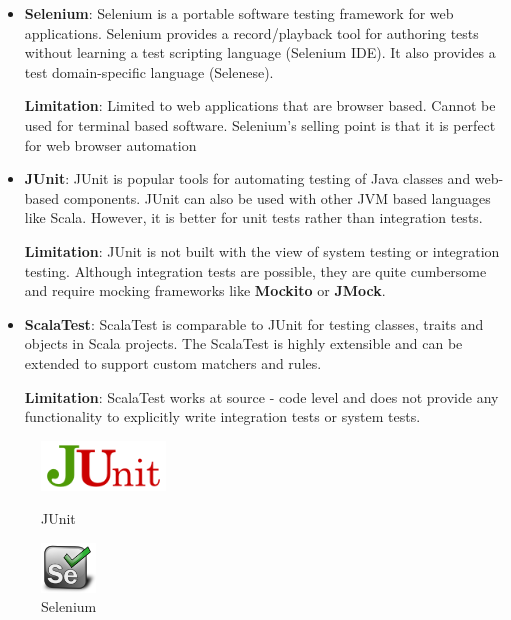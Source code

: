 \documentclass[12pt]{article}
\begin{document}
\begin{itemize}
\item \textbf{Selenium}: Selenium is a portable software testing framework for web applications. Selenium provides a record/playback tool for authoring tests without learning a test scripting language (Selenium IDE). It also provides a test domain-specific language (Selenese).
\bigskip

\textbf{Limitation}: Limited to web applications that are browser based. Cannot be used for terminal based software. Selenium's selling point is that it is perfect for web browser automation

\item \textbf{JUnit}: JUnit is popular tools for automating testing of Java classes and web-based components. JUnit can also be used with other JVM based languages like Scala. However, it is better for unit tests rather than integration tests.

\textbf{Limitation}: JUnit is not built with the view of system testing or integration testing. Although integration tests are possible, they are quite cumbersome and require mocking frameworks like \textbf{Mockito} or \textbf{JMock}.
\bigskip


\item \textbf{ScalaTest}: ScalaTest is comparable to JUnit for testing classes, traits and objects in Scala projects. The ScalaTest is highly extensible and can be extended to support custom matchers and rules.
\bigskip

\textbf{Limitation}: ScalaTest works at source - code level and does not provide any functionality to explicitly write integration tests or system tests. 
\bigskip
\end{itemize}

\begin{figure}[ht]
\centering
\quad
\begin{minipage}[b]{0.45\linewidth}
\includegraphics[height=50px]{figures/junit_logo.png}
\caption{JUnit}
\label{fig:minipage2}
\end{minipage}
\begin{minipage}[b]{0.45\linewidth}
\includegraphics[height=50px]{figures/selenium_logo.png}
\caption{Selenium}
\label{fig:minipage2}
\end{minipage}
\end{figure}
\end{document}
